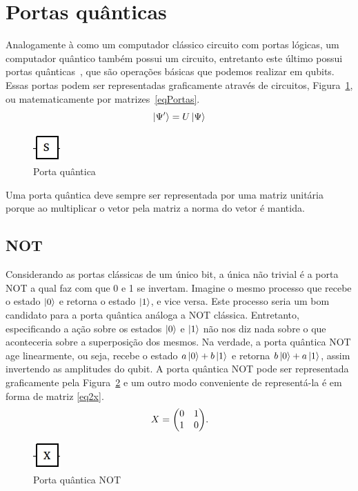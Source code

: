 \documentclass[a4paper, 12pt, oneside]{book}
\begin{document}
\section{Portas quânticas}
Analogamente à como um computador clássico circuito com portas lógicas, um computador quântico também possui um circuito, entretanto este último possui portas quânticas~\cite{nielsen}, que são operações básicas que podemos realizar em qubits. Essas portas podem ser representadas graficamente através de circuitos, Figura~\ref{fig:portaQuantica}, ou matematicamente por matrizes~\eqref{eqPortas}.
\begin{equation}\label{eqPortas}
\ket{\Psi'} =  U\ket{\Psi}
\end{equation}

\begin{figure}[H]
\centering
\includegraphics[scale=0.75]{s.jpg}
\caption{Porta quântica}
\label{fig:portaQuantica}
\end{figure}

Uma porta quântica deve sempre ser representada por uma matriz unitária porque ao multiplicar o vetor pela matriz a norma do vetor é mantida.
\subsection{NOT} 
Considerando as portas clássicas de um único bit, a única não trivial é a porta NOT a qual faz com que 0 e 1 se invertam. Imagine o mesmo processo que recebe o estado $\ket{0}$ e retorna o estado $\ket{1}$, e vice versa. Este processo seria um bom candidato para a porta quântica análoga a NOT clássica. Entretanto, especificando a ação sobre os estados $\ket{0}$ e $\ket{1}$ não nos diz nada sobre o que aconteceria sobre a superposição dos mesmos. Na verdade, a porta quântica NOT age linearmente, ou seja, recebe o estado $a\ket{0} + b\ket{1}$ e retorna $b\ket{0} + a\ket{1}$, assim invertendo as amplitudes do qubit. A porta quântica NOT pode ser representada graficamente pela Figura~\ref{fig:not} e um outro modo conveniente de representá-la é em forma de matriz \eqref{eq2x}.
\begin{equation}\label{eq2x}
X =  \mqty(0&1\\1&0).
\end{equation}

\begin{figure}[H]
\centering
\includegraphics[scale=0.75]{x.jpg}
\caption{Porta quântica NOT}
\label{fig:not}
\end{figure}
\end{document}
